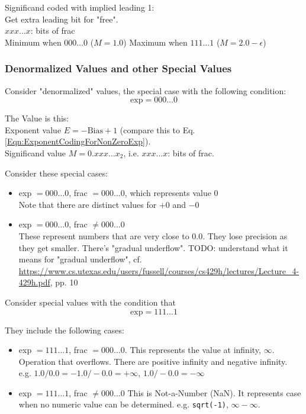 \documentclass[10pt]{amsart}
\begin{document}
\begin{multicols*}{2}
Significand coded with implied leading 1: \\
Get extra leading bit for "free". \\
$xxx\dots x$: bits of frac \\
Minimum when $000 \dots 0$ ($M=1.0$)
Maximum when $111 \dots 1$ ($M = 2.0 - \epsilon$)

\subsubsection{Denormalized Values and other Special Values}

Consider "denormalized" values, the special case with the following condition:
\[
\text{exp} = 000\dots 0
\]

The Value is this: \\
Exponent value $E = -\text{Bias} + 1$ (compare this to Eq. \ref{Eqn:ExponentCodingForNonZeroExp}). \\
Significand value $M = 0.xxx\dots x_2$, i.e. $xxx...x$: bits of frac.

Consider these special cases:
\begin{itemize}
	\item exp $= 000\dots 0$, frac $ = 000\dots 0$, which represents value 0 \\
	Note that there are distinct values for $+0$ and $-0$
	\item exp $= 000 \dots 0$, frac $\neq 000\dots 0$ \\
	These represent numbers that are very close to 0.0. They lose precision as they get smaller. There's "gradual underflow". TODO: understand what it means for "gradual underflow", cf. \url{https://www.cs.utexas.edu/users/fussell/courses/cs429h/lectures/Lecture_4-429h.pdf}, pp. 10
\end{itemize}

Consider special values with the condition that 
\[
\text{exp} = 111\dots 1
\]

They include the following cases: 
\begin{itemize}
	\item exp $ = 111\dots 1$, frac $= 000 \dots 0$. This represents the value at infinity, $\infty$. Operation that overflows. There are positive infinity and negative infinity. \\
	e.g. $1.0/0.0 = -1.0/-0.0 = +\infty$, $1.0/-0.0 = -\infty$
	\item exp $ = 111\dots 1$, frac $\neq 000\dots 0$ This is Not-a-Number (NaN). It represents case when no numeric value can be determined. e.g. \verb|sqrt(-1)|, $\infty - \infty$.
\end{itemize}



\end{multicols*}
\end{document}
